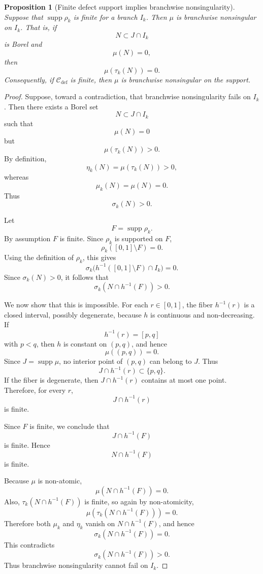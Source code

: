 \documentclass[11pt]{amsart}
\theoremstyle{plain}
\newtheorem{proposition}[theorem]{Proposition}
\theoremstyle{definition}
\theoremstyle{remark}
\DeclareMathOperator{\supp}{supp}
\newcommand{\cC}{\mathcal C}
\begin{document}
\begin{proposition}[Finite defect support implies branchwise nonsingularity]\label{prop:defect-support-nonsingular}
Suppose that \(\supp\rho_k\) is finite for a branch \(I_k\). Then \(\mu\) is branchwise
nonsingular on \(I_k\). That is, if
\[
        N\subset J\cap I_k
\]
is Borel and
\[
        \mu(N)=0,
\]
then
\[
        \mu(\tau_k(N))=0.
\]
Consequently, if \(\cC_{\mathrm{def}}\) is finite, then \(\mu\) is branchwise
nonsingular on the support.
\end{proposition}

\begin{proof}
Suppose, toward a contradiction, that branchwise nonsingularity fails on \(I_k\). Then
there exists a Borel set
\[
        N\subset J\cap I_k
\]
such that
\[
        \mu(N)=0
\]
but
\[
        \mu(\tau_k(N))>0.
\]
By definition,
\[
        \eta_k(N)=\mu(\tau_k(N))>0,
\]
whereas
\[
        \mu_k(N)=\mu(N)=0.
\]
Thus
\[
        \sigma_k(N)>0.
\]

Let
\[
        F=\supp\rho_k.
\]
By assumption \(F\) is finite. Since \(\rho_k\) is supported on \(F\),
\[
        \rho_k([0,1]\setminus F)=0.
\]
Using the definition of \(\rho_k\), this gives
\[
        \sigma_k\bigl(h^{-1}([0,1]\setminus F)\cap I_k\bigr)=0.
\]
Since \(\sigma_k(N)>0\), it follows that
\[
        \sigma_k(N\cap h^{-1}(F))>0.
\]

We now show that this is impossible. For each \(r\in[0,1]\), the fiber \(h^{-1}(r)\)
is a closed interval, possibly degenerate, because \(h\) is continuous and
non-decreasing. If
\[
        h^{-1}(r)=[p,q]
\]
with \(p<q\), then \(h\) is constant on \((p,q)\), and hence
\[
        \mu((p,q))=0.
\]
Since \(J=\supp\mu\), no interior point of \((p,q)\) can belong to \(J\). Thus
\[
        J\cap h^{-1}(r)\subset\{p,q\}.
\]
If the fiber is degenerate, then \(J\cap h^{-1}(r)\) contains at most one point.
Therefore, for every \(r\),
\[
        J\cap h^{-1}(r)
\]
is finite.

Since \(F\) is finite, we conclude that
\[
        J\cap h^{-1}(F)
\]
is finite. Hence
\[
        N\cap h^{-1}(F)
\]
is finite.

Because \(\mu\) is non-atomic,
\[
        \mu(N\cap h^{-1}(F))=0.
\]
Also, \(\tau_k(N\cap h^{-1}(F))\) is finite, so again by non-atomicity,
\[
        \mu(\tau_k(N\cap h^{-1}(F)))=0.
\]
Therefore both \(\mu_k\) and \(\eta_k\) vanish on \(N\cap h^{-1}(F)\), and hence
\[
        \sigma_k(N\cap h^{-1}(F))=0.
\]
This contradicts
\[
        \sigma_k(N\cap h^{-1}(F))>0.
\]
Thus branchwise nonsingularity cannot fail on \(I_k\).
\end{proof}
\end{document}
